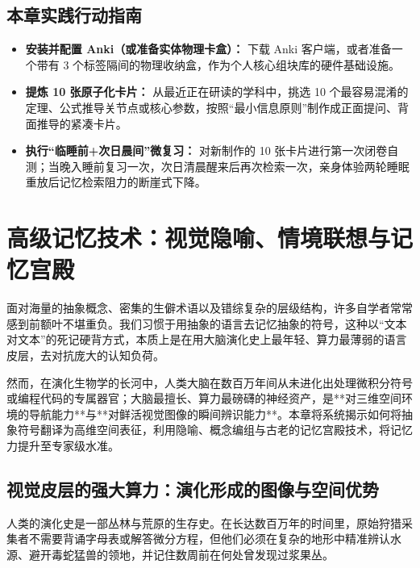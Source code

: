 \documentclass[12pt,a4paper,openany]{ctexbook}
\begin{document}
\section*{本章实践行动指南}
\begin{practicebox}[本周记忆架构搭建清单]
\begin{itemize}
    \item[$\square$] \textbf{安装并配置 Anki（或准备实体物理卡盒）：} 下载 Anki 客户端，或者准备一个带有 3 个标签隔间的物理收纳盒，作为个人核心组块库的硬件基础设施。
    \item[$\square$] \textbf{提炼 10 张原子化卡片：} 从最近正在研读的学科中，挑选 10 个最容易混淆的定理、公式推导关节点或核心参数，按照“最小信息原则”制作成正面提问、背面推导的紧凑卡片。
    \item[$\square$] \textbf{执行“临睡前+次日晨间”微复习：} 对新制作的 10 张卡片进行第一次闭卷自测；当晚入睡前复习一次，次日清晨醒来后再次检索一次，亲身体验两轮睡眠重放后记忆检索阻力的断崖式下降。
\end{itemize}
\end{practicebox}

\chapter{高级记忆技术：视觉隐喻、情境联想与记忆宫殿}

面对海量的抽象概念、密集的生僻术语以及错综复杂的层级结构，许多自学者常常感到前额叶不堪重负。我们习惯于用抽象的语言去记忆抽象的符号，这种以“文本对文本”的死记硬背方式，本质上是在用大脑演化史上最年轻、算力最薄弱的语言皮层，去对抗庞大的认知负荷。

然而，在演化生物学的长河中，人类大脑在数百万年间从未进化出处理微积分符号或编程代码的专属器官；大脑最擅长、算力最磅礴的神经资产，是**对三维空间环境的导航能力**与**对鲜活视觉图像的瞬间辨识能力**。本章将系统揭示如何将抽象符号翻译为高维空间表征，利用隐喻、概念编组与古老的记忆宫殿技术，将记忆力提升至专家级水准。

\section{视觉皮层的强大算力：演化形成的图像与空间优势}

人类的演化史是一部丛林与荒原的生存史。在长达数百万年的时间里，原始狩猎采集者不需要背诵字母表或解答微分方程，但他们必须在复杂的地形中精准辨认水源、避开毒蛇猛兽的领地，并记住数周前在何处曾发现过浆果丛。
\end{document}

